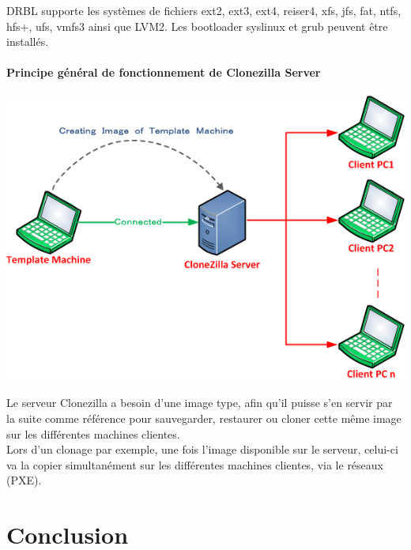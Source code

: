 \documentclass[a4paper,12pt,one side,titlepage]{report}
\begin{document}
DRBL supporte les systèmes de fichiers ext2, ext3, ext4, reiser4, xfs, jfs, fat, ntfs, hfs+, ufs, vmfs3 ainsi que LVM2. Les bootloader syslinux et grub peuvent être installés.

\subsubsection{Principe général de fonctionnement de Clonezilla Server}
\vspace{1em}
\begin{center}\includegraphics[scale=0.7]{./img/clonezilla2.png}\end{center}
\vspace{1em}
Le serveur Clonezilla a besoin d'une image type, afin qu'il puisse s'en servir par la suite comme référence pour sauvegarder, restaurer ou cloner cette même image sur les différentes machines clientes.\\
Lors d'un clonage par exemple, une fois l'image disponible sur le serveur, celui-ci va la copier simultanément sur les différentes machines clientes, via le réseaux (PXE).

\chapter{Conclusion}
\end{document}
